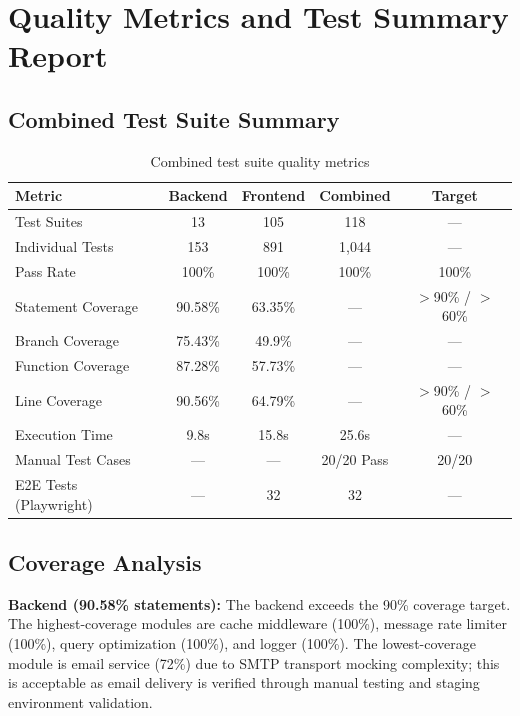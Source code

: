 \documentclass[12pt,letterpaper]{article}
\begin{document}
\section{Quality Metrics and Test Summary Report}

\subsection{Combined Test Suite Summary}

\begin{table}[!htbp]
\centering
\begin{tabularx}{\textwidth}{|>{\raggedright\arraybackslash}X|c|c|c|c|}
\hline
\rowcolor{TableHeader}\textcolor{TableHeaderText}{\textbf{Metric}} & \textcolor{TableHeaderText}{\textbf{Backend}} & \textcolor{TableHeaderText}{\textbf{Frontend}} & \textcolor{TableHeaderText}{\textbf{Combined}} & \textcolor{TableHeaderText}{\textbf{Target}} \\
\hline
Test Suites & 13 & 105 & 118 & --- \\
\hline
\rowcolor{TableRowAlt}
Individual Tests & 153 & 891 & 1,044 & --- \\
\hline
Pass Rate & 100\% & 100\% & 100\% & 100\% \\
\hline
\rowcolor{TableRowAlt}
Statement Coverage & 90.58\% & 63.35\% & --- & $>$90\% / $>$60\% \\
\hline
Branch Coverage & 75.43\% & 49.9\% & --- & --- \\
\hline
\rowcolor{TableRowAlt}
Function Coverage & 87.28\% & 57.73\% & --- & --- \\
\hline
Line Coverage & 90.56\% & 64.79\% & --- & $>$90\% / $>$60\% \\
\hline
\rowcolor{TableRowAlt}
Execution Time & 9.8s & 15.8s & 25.6s & --- \\
\hline
Manual Test Cases & --- & --- & 20/20 Pass & 20/20 \\
\hline
\rowcolor{TableRowAlt}
E2E Tests (Playwright) & --- & 32 & 32 & --- \\
\hline
\end{tabularx}
\caption{Combined test suite quality metrics}
\end{table}

\subsection{Coverage Analysis}

\textbf{Backend (90.58\% statements):} The backend exceeds the 90\% coverage target. The highest-coverage modules are cache middleware (100\%), message rate limiter (100\%), query optimization (100\%), and logger (100\%). The lowest-coverage module is email service (72\%) due to SMTP transport mocking complexity; this is acceptable as email delivery is verified through manual testing and staging environment validation.
\end{document}
